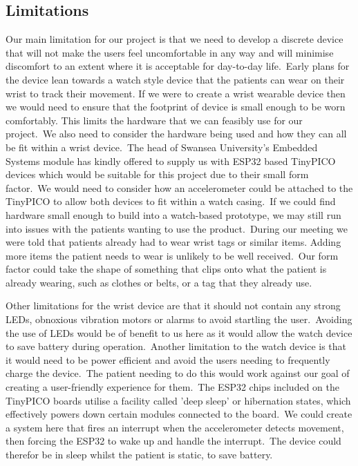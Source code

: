         \subsection{Limitations}
            Our main limitation for our project is that we need to develop a discrete device that will not make the
            users feel uncomfortable in any way and will minimise discomfort to an extent where it is
            acceptable for day-to-day life.\ Early plans for the device lean towards a watch style device that the
            patients can wear on their wrist to track their movement. If we were to create a wrist wearable device
            then we would need to ensure that the footprint of device is small enough to be worn comfortably. This limits
            the hardware that we can feasibly use for our project.\ We also need to consider the hardware being
            used and how they can all be fit within a wrist device.\ The head of Swansea University’s Embedded Systems
            module has kindly offered to supply us with ESP32 based TinyPICO devices which would be suitable for this
            project due to their small form factor.\ We would need to consider how an accelerometer could be attached to
            the TinyPICO to allow both devices to fit within a watch casing.\ If we could find hardware small
            enough to build into a watch-based prototype, we may still run into issues with the patients wanting to use
            the product.\ During our meeting we were told that patients already had to wear wrist tags or similar items.
            Adding more items the patient needs to wear is unlikely to be well received.\ Our form factor could take the
            shape of something that clips onto what the patient is already wearing, such as clothes or belts, or a tag
            that they already use.

            Other limitations for the wrist device are that it should not contain any strong LEDs, obnoxious vibration
            motors or alarms to avoid startling the user.\ Avoiding the use of LEDs would be of benefit to us here as it
            would allow the watch device to save battery during operation.\ Another limitation to the watch device is
            that it would need to be power efficient and avoid the users needing to frequently charge the device.\ The
            patient needing to do this would work against our goal of creating a user-friendly experience for them.\ The
            ESP32 chips included on the TinyPICO boards utilise a facility called 'deep sleep' or hibernation states,
            which effectively powers down certain modules connected to the board.\ We could create a system here that
            fires an interrupt when the accelerometer detects movement, then forcing the ESP32 to wake up and handle the
            interrupt.\ The device could therefor be in sleep whilst the patient is static, to save battery.

